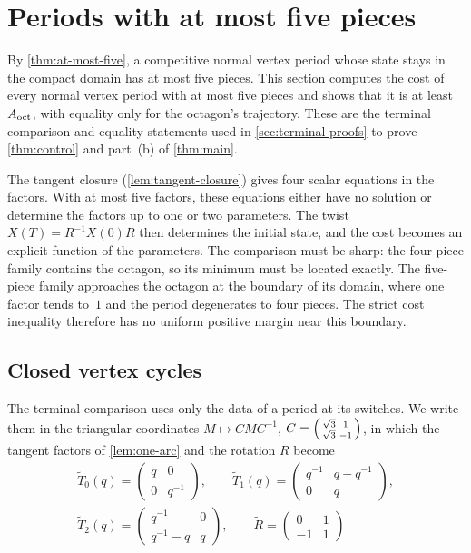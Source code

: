 \section{Periods with at most five pieces}\label{sec:terminal}

By \cref{thm:at-most-five}, a competitive normal vertex period whose state stays in the compact
domain has at most five pieces. This section computes the cost of every normal vertex period with
at most five pieces and shows that it is at least $A_{\mathrm{oct}}$, with equality only for the octagon's
trajectory. These are the terminal comparison and equality statements used in
\cref{sec:terminal-proofs} to prove \cref{thm:control} and part~(b) of \cref{thm:main}.

The tangent closure (\cref{lem:tangent-closure}) gives four scalar equations in the factors. With
at most five factors, these equations either have no solution or determine the factors up to one
or two parameters. The twist $X(T)=R^{-1}X(0)R$ then determines the initial state, and the cost
becomes an explicit function of the parameters. The comparison must be sharp: the four-piece
family contains the octagon, so its minimum must be located exactly. The five-piece family
approaches the octagon at the boundary of its domain, where one factor tends to~$1$ and the period
degenerates to four pieces. The strict cost inequality therefore has no uniform positive margin
near this boundary.

\subsection{Closed vertex cycles}\label{sec:terminal-cycles}

The terminal comparison uses only the data of a period at its switches. We write them in the
triangular coordinates $M\mapsto CMC^{-1}$,
$C=\begin{psmallmatrix}\sqrt3&1\\\sqrt3&-1\end{psmallmatrix}$, in which the tangent factors of
\cref{lem:one-arc} and the rotation $R$ become
\begin{equation}\label{eq:term-tri}
\begin{gathered}
 \widetilde T_0(q)=\begin{pmatrix}q&0\\0&q^{-1}\end{pmatrix},\qquad
 \widetilde T_1(q)=\begin{pmatrix}q^{-1}&q-q^{-1}\\0&q\end{pmatrix},\\
 \widetilde T_2(q)=\begin{pmatrix}q^{-1}&0\\q^{-1}-q&q\end{pmatrix},\qquad
 \widetilde R=\begin{pmatrix}0&1\\-1&1\end{pmatrix}
\end{gathered}
\end{equation}

